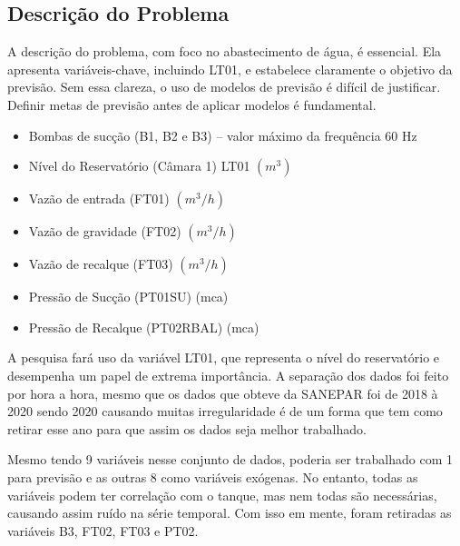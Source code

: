 \subsection{Descri\c c\~ao do Problema} \label{subsec:descricao}
A descrição do problema, com foco no abastecimento de água, é essencial. Ela apresenta variáveis-chave, incluindo LT01, e estabelece claramente o objetivo da previsão. Sem essa clareza, o uso de modelos de previsão é difícil de justificar. Definir metas de previsão antes de aplicar modelos é fundamental.


\begin{itemize}
	\item Bombas de sucção (B1, B2 e B3) – valor máximo da frequência $60$ Hz
	
	\item Nível do Reservatório (Câmara 1) LT01 $ (m^3) $ 
	
	\item Vazão de entrada (FT01) $ (m^3/h) $
	
	\item Vazão de gravidade (FT02) $ (m^3/h) $
	
	\item Vazão de recalque (FT03) $ (m^3/h) $
	
	\item Pressão de Sucção (PT01SU) (mca)
	
	\item Pressão de Recalque (PT02RBAL) (mca)
\end{itemize}

A pesquisa fará uso da variável LT01, que representa o nível do reservatório e desempenha um papel de extrema importância.
A separação dos dados foi feito por hora a hora, mesmo que os dados que obteve da SANEPAR foi de 2018 à 2020 sendo 2020 causando muitas irregularidade é de um forma que tem como retirar esse ano para que assim os dados seja melhor trabalhado. 

Mesmo tendo 9 variáveis nesse conjunto de dados, poderia ser trabalhado com 1 para previsão e as outras 8 como variáveis exógenas. No entanto, todas as variáveis podem ter correlação com o tanque, mas nem todas são necessárias, causando assim ruído na série temporal. Com isso em mente, foram retiradas as variáveis B3, FT02, FT03 e PT02.